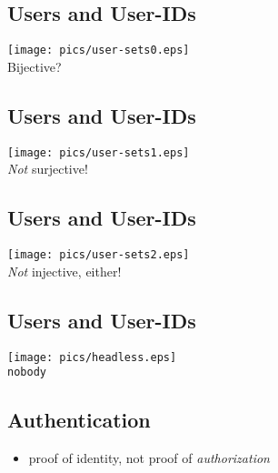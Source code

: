 \documentclass[xga]{xdvislides}
\begin{document}
\subsection{Users and User-IDs}
\begin{center}
	\texttt{[image: pics/user-sets0.eps]} \\
	Bijective?
\end{center}

\subsection{Users and User-IDs}
\begin{center}
	\texttt{[image: pics/user-sets1.eps]} \\
	{\em Not} surjective!
\end{center}

\subsection{Users and User-IDs}
\begin{center}
	\texttt{[image: pics/user-sets2.eps]} \\
	{\em Not} injective, either!
\end{center}

\subsection{Users and User-IDs}

\begin{center}
	\texttt{[image: pics/headless.eps]} \\
	{\tt nobody}
\end{center}

%
\subsection{Authentication}

\begin{itemize}
	\item proof of identity, not proof of {\em authorization}
\end{itemize}
\end{document}
